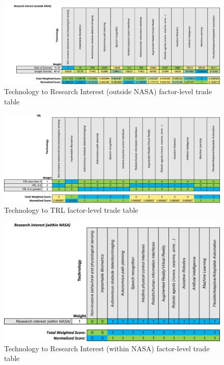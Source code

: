 \begin{figure}[b!]
    \begin{center}
        \includegraphics[width=0.8\linewidth]{figures/TradeStudy/figurea6.png}
        \caption{Technology to Research Interest (outside NASA) factor-level trade table}
    \end{center}
\end{figure}

\begin{figure}[b!]
    \begin{center}
        \includegraphics[width=0.8\linewidth]{figures/TradeStudy/figurea7.png}
        \caption{Technology to TRL factor-level trade table}
    \end{center}
\end{figure}

\begin{figure}[b!]
    \begin{center}
        \includegraphics[width=0.8\linewidth]{figures/TradeStudy/figurea8.png}
        \caption{Technology to Research Interest (within NASA) factor-level trade table}
    \end{center}
\end{figure}

